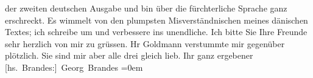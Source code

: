 \begin{ledgroupsized}[t]{13cm}
                    der zweiten deutschen Ausgabe und bin über die fürchterliche Sprache ganz
                    erschreckt. Es wimmelt von den plumpsten Misverständnischen meines dänischen Textes; ich schreibe um und
                    verbessere ins unendliche.\pend
           \pstart
           Ich bitte Sie Ihre Freunde sehr herzlich von mir zu grüssen. Hr Goldmann verstummte mir gegenüber plötzlich. Sie sind mir
                    aber alle drei gleich lieb.\pend
           \pstart
           Ihr ganz ergebener{\\[\baselineskip]}\spacefill\mbox{{[}hs. Brandes:{]} Georg Brandes}\pend
           \leftskip=0em{}\endnumbering{}\end{ledgroupsized}  \newcommand{\dateiname}{L00701}\newcommand{\titel}{Georg Brandes an Arthur Schnitzler, [13. 7. 1897]}\newcommand{\editorInnen}{Martin Anton Müller und Gerd-Hermann Susen}
      